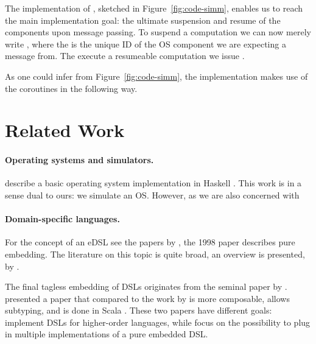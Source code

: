 The implementation of , sketched in Figure~\ref{fig:code-simm}, enables us to reach the main implementation goal: the ultimate suspension and resume of the components upon message passing.
To suspend a computation we can now merely write , where the  is the unique ID of the OS component we are expecting a message from.
The execute a resumeable computation we issue .

As one could infer from Figure~\ref{fig:code-simm}, the implementation makes use of the coroutines in the following way. 


\section{Related Work}
\label{sec:related-work}

\paragraph{Operating systems and simulators.}

\citeauthor{house} describe a basic operating system implementation in Haskell \cite{house}.
This work is in a sense dual to ours: we simulate an OS.
However, as we are also concerned with


\paragraph{Domain-specific languages.}
For the concept of an eDSL see the papers by \citeauthor{hudak1} \cite{hudak1,hudak2}, the 1998 paper describes pure embedding.
The literature on this topic is quite broad, an overview is presented, \eg by \citeauthor{dsl-survey} \cite{dsl-survey}.

The final tagless embedding of DSLs originates from the seminal paper by \citeauthor{final_tagless_embedding} \cite{final_tagless_embedding}.
\citeauthor{Hofer:2008:PED:1449913.1449935} \cite{Hofer:2008:PED:1449913.1449935} presented a paper that compared to the work by \citeauthor{final_tagless_embedding} \cite{final_tagless_embedding} is more composable, allows subtyping, and is done in Scala \cite{odersky2008programming}.
These two papers have different goals: \citeauthor{final_tagless_embedding} implement DSLs for higher-order languages, while \citeauthor{Hofer:2008:PED:1449913.1449935} focus on the possibility to plug in multiple implementations of a pure embedded DSL.


